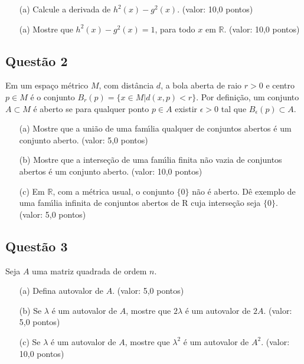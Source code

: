 \documentclass{report}
\begin{document}
\begin{enumerate}

\item[(a)] Calcule a derivada de $h^2(x) - g^2(x)$. (valor: 10,0 pontos) 

\item[(a)] Mostre que $h^2(x) - g^2(x) = 1$, para todo $x$ em $\mathbb R$. (valor: 10,0 pontos)

\end{enumerate}

\subsection{\color{blue} Quest\~ao 2}

Em um espa\c co m\'etrico $M$, com dist\^ancia $d$, a bola aberta de raio $r > 0$ e centro $p\in M$ \'e o conjunto $B_r(p) = \{x\in M | d(x,p) < r\}$. Por defini\c c\~ao, um conjunto $A \subset M$ \'e aberto se para qualquer ponto $p \in A$ existir $\epsilon > 0$ tal que $B_\epsilon(p) \subset A$.

\begin{enumerate}

\item[(a)] Mostre que a uni\~ao de uma fam\'\i lia qualquer de conjuntos abertos \'e um conjunto aberto. (valor: 5,0 pontos)

\item[(b)] Mostre que a interse\c c\~ao de uma fam\'\i lia finita n\~ao vazia de conjuntos abertos \'e um conjunto aberto. (valor: 10,0 pontos) 

\item[(c)] Em $\mathbb R$, com a m\'etrica usual, o conjunto $\{0\}$ n\~ao \'e aberto. D\^e exemplo de uma fam\'\i lia infinita de conjuntos abertos de R cuja interse\c c\~ao seja $\{0\}$. (valor: 5,0 pontos)

\end{enumerate}

\subsection{\color{blue} Quest\~ao 3}

Seja $A$ uma matriz quadrada de ordem $n$.

\begin{enumerate}

\item[(a)] Defina autovalor de $A$. (valor: 5,0 pontos)

\item[(b)] Se $\lambda$ \'e um autovalor de $A$, mostre que $2\lambda$ \'e um autovalor de $2A$. (valor: 5,0 pontos)

\item[(c)] Se $\lambda$ \'e um autovalor de $A$, mostre que $\lambda ^2$ \'e um autovalor de $A^2$. (valor: 10,0 pontos)

\end{enumerate}
\end{document}
